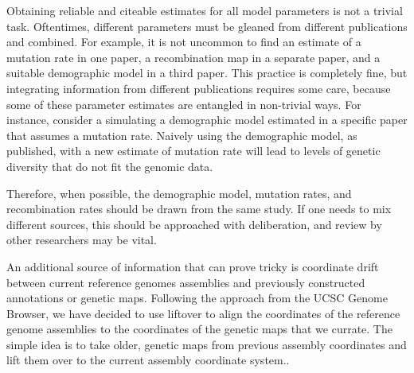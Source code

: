 \documentclass[hidelinks]{article}
\newcommand{\stdpopsim}{\texttt{stdpopsim}\xspace}
\begin{document}
Obtaining reliable and citeable estimates for all model parameters is not a trivial task.
Oftentimes, different parameters must be gleaned from different publications and combined.
For example, it is not uncommon to find an estimate of a mutation rate in one paper,
a recombination map in a separate paper, and a suitable demographic model in a third paper.
This practice is completely fine, but integrating information from different publications requires some care,
because some of these parameter estimates are entangled in non-trivial ways.
For instance, consider a simulating a demographic model estimated in a specific paper that assumes
a mutation rate. Naively using the demographic model, as published, with a new estimate of mutation rate
will lead to levels of genetic diversity that do not fit the genomic data.
%


%
Therefore, when possible, the demographic model, mutation rates,
and recombination rates should be drawn from the same study. 
If one needs to mix different sources, this should be approached with deliberation, 
and review by other researchers may be vital.

An additional source of information that can prove tricky is coordinate drift between current
reference genomes assemblies and previously constructed annotations or genetic maps. 
Following the approach from the UCSC Genome Browser, we have decided to use liftover 
to align the coordinates of the reference genome assemblies to the coordinates of the
genetic maps that we currate. The simple idea is to take older, genetic maps from 
previous assembly coordinates and lift them over to the current assembly coordinate system..
\end{document}
